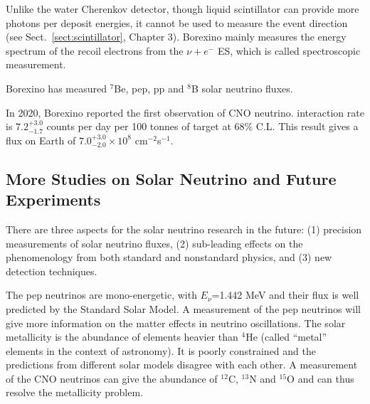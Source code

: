 Unlike the water Cherenkov detector, though liquid scintillator can provide more photons per deposit energies, it cannot be used to measure the event direction (see Sect.~\ref{sect:scintillator}, Chapter 3). Borexino mainly measures the energy spectrum of the recoil electrons from the $\nu+e^-$ ES, which is called spectroscopic measurement\cite{agostini2020improved}.


Borexino has measured $^7$Be, pep, pp and $^8$B solar neutrino fluxes\cite{agostini2018comprehensive}. 

In 2020, Borexino reported the first observation of CNO neutrino\cite{borexino2020experimental}. interaction rate is $7.2^{+3.0}_{-1.7}$ counts per day per 100 tonnes of target at 68\% C.L. This result gives a flux on Earth of $7.0^{+3.0}_{-2.0}\times 10^8$ cm$^{-2}$s$^{-1}$.

%

\subsection{More Studies on Solar Neutrino and Future Experiments}\label{sect:futureSolar}
There are three aspects for the solar neutrino research in the future: (1) precision measurements of solar neutrino fluxes, (2) 
sub-leading effects on the phenomenology from both standard and nonstandard physics, and (3) new detection techniques\cite{antonio2018state}.

The pep neutrinos are mono-energetic, with $E_\nu$=1.442 MeV and their flux is well predicted by the Standard Solar Model\cite{davini2016cno}. A measurement of the pep neutrinos will give more information on the matter effects in neutrino oscillations. 
The solar metallicity is the abundance of elements heavier than $^4$He (called ``metal'' elements in the context of astronomy). It is poorly constrained and the predictions from different solar models disagree with each other. A measurement of the CNO neutrinos can give the abundance of $^{12}$C, $^{13}$N and $^{15}$O and can thus resolve the metallicity problem\cite{cerdeno2018cno}.

